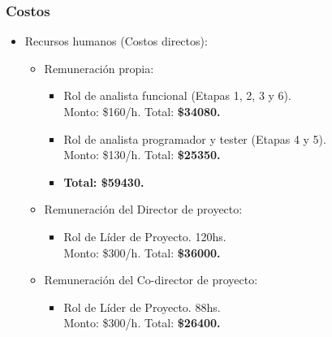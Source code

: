 \begin{frame}[t,fragile]
	\frametitle {Costos}
		\begin{itemize}
			\item Recursos humanos (Costos directos):
			\begin{itemize}
				\item Remuneraci\'on propia: 
				\begin{itemize}
					\item Rol de analista funcional (Etapas 1, 2, 3 y 6). \\Monto: \$160/h. Total: \textbf{\$34080.} 
					\item Rol de analista programador y tester (Etapas 4 y 5).\\Monto: \$130/h. Total: \textbf{\$25350.} 
					\item \textbf{Total: \$59430.} 		
				\end{itemize}
				\pause
				\item Remuneraci\'on del Director de proyecto:
				\begin{itemize}
					\item Rol de L\'ider de Proyecto. 120hs.
					\\Monto: \$300/h. Total: \textbf{\$36000.} 	
				\end{itemize}
				\pause
				\item Remuneraci\'on del Co-director de proyecto:
				\begin{itemize}
					\item Rol de L\'ider de Proyecto. 88hs.
					\\Monto: \$300/h. Total: \textbf{\$26400.} 	
				\end{itemize}
			\end{itemize}
		
		\end{itemize}
		
\end{frame}
